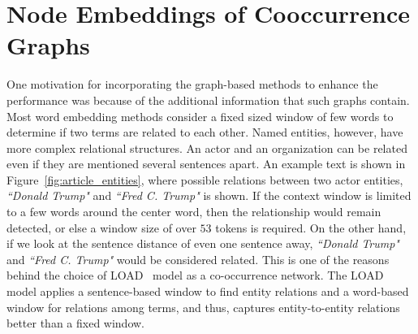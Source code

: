 \section{Node Embeddings of Cooccurrence Graphs}\label{sec:graph_based}


One motivation for incorporating the graph-based methods to enhance the performance was because of the additional information that such graphs contain. Most word embedding methods consider a fixed sized window of few words to determine if two terms are related to each other. Named entities, however, have more complex relational structures. An actor and an organization can be related even if they are mentioned several sentences apart. An example text is shown in Figure~\ref{fig:article_entities}, where possible relations between  two actor entities, \emph{``Donald Trump"} and \emph{``Fred C. Trump"} is shown. If the context window is limited to a few words around the center word, then the relationship would remain detected, or else a window size of over $53$ tokens is required. On the other hand, if we look at the sentence distance of even one sentence away,  \emph{``Donald Trump"} and \emph{``Fred C. Trump"} would be considered related. This is one of the reasons behind the choice of LOAD~ model as a co-occurrence network. The LOAD model applies a sentence-based window to find entity relations and a word-based window for relations among terms, and thus, captures entity-to-entity relations better than a fixed window.

